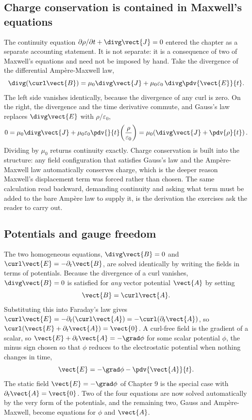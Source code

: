 \subsection{Charge conservation is contained in Maxwell's equations}

The continuity equation $\partial\rho/\partial t + \divg\vect{J} = 0$
entered the chapter as a separate accounting statement. It is not
separate: it is a consequence of two of Maxwell's equations and need not
be imposed by hand. Take the divergence of the differential
Amp\`ere-Maxwell law,
\[
\divg(\curl\vect{B}) = \mu_0\divg\vect{J} + \mu_0\varepsilon_0\,
\divg\pdv{\vect{E}}{t}.
\]
The left side vanishes identically, because the divergence of any curl is
zero. On the right, the divergence and the time derivative commute, and
Gauss's law replaces $\divg\vect{E}$ with $\rho/\varepsilon_0$,
\[
0 = \mu_0\divg\vect{J} + \mu_0\varepsilon_0\pdv{}{t}\!\left(
\frac{\rho}{\varepsilon_0}\right) = \mu_0\!\left(\divg\vect{J} +
\pdv{\rho}{t}\right).
\]
Dividing by $\mu_0$ returns continuity exactly. Charge conservation is
built into the structure: any field configuration that satisfies Gauss's
law and the Amp\`ere-Maxwell law automatically conserves charge, which is
the deeper reason Maxwell's displacement term was forced rather than
chosen. The same calculation read backward, demanding continuity and
asking what term must be added to the bare Amp\`ere law to supply it, is
the derivation the exercises ask the reader to carry out.

\subsection{Potentials and gauge freedom}

The two homogeneous equations, $\divg\vect{B} = 0$ and
$\curl\vect{E} = -\partial_t\vect{B}$, are solved identically by writing
the fields in terms of potentials. Because the divergence of a curl
vanishes, $\divg\vect{B} = 0$ is satisfied for \emph{any} vector
potential $\vect{A}$ by setting
\[
\vect{B} = \curl\vect{A}.
\]
Substituting this into Faraday's law gives $\curl\vect{E} =
-\partial_t(\curl\vect{A}) = -\curl(\partial_t\vect{A})$, so
$\curl(\vect{E} + \partial_t\vect{A}) = \vect{0}$. A curl-free field is
the gradient of a scalar, so $\vect{E} + \partial_t\vect{A} =
-\grad\phi$ for some scalar potential $\phi$, the minus sign chosen so
that $\phi$ reduces to the electrostatic potential when nothing changes
in time,
\[
\vect{E} = -\grad\phi - \pdv{\vect{A}}{t}.
\]
The static field $\vect{E} = -\grad\phi$ of Chapter 9 is the special case
with $\partial_t\vect{A} = \vect{0}$. Two of the four equations are now
solved automatically by the very form of the potentials, and the
remaining two, Gauss and Amp\`ere-Maxwell, become equations for $\phi$
and $\vect{A}$.

